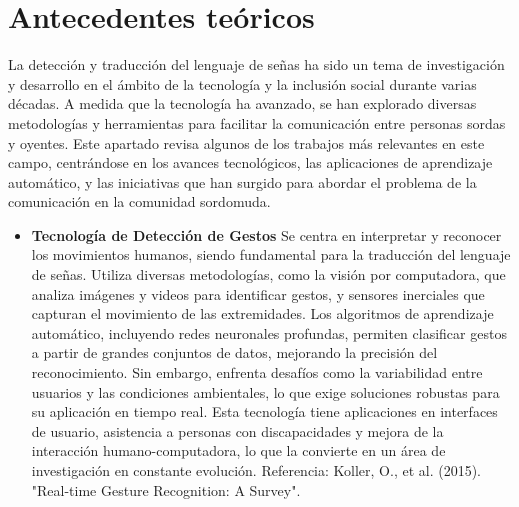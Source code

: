 \section{Antecedentes teóricos}
La detección y traducción del lenguaje de señas ha sido un tema de investigación y desarrollo en el ámbito de la tecnología y la inclusión social durante varias décadas. A medida que la tecnología ha avanzado, se han explorado diversas metodologías y herramientas para facilitar la comunicación entre personas sordas y oyentes. Este apartado revisa algunos de los trabajos más relevantes en este campo, centrándose en los avances tecnológicos, las aplicaciones de aprendizaje automático, y las iniciativas que han surgido para abordar el problema de la comunicación en la comunidad sordomuda.

\begin{itemize} 
\item \textbf{Tecnología de Detección de Gestos} \newline
Se centra en interpretar y reconocer los movimientos humanos, siendo fundamental para la traducción del lenguaje de señas. Utiliza diversas metodologías, como la visión por computadora, que analiza imágenes y videos para identificar gestos, y sensores inerciales que capturan el movimiento de las extremidades. Los algoritmos de aprendizaje automático, incluyendo redes neuronales profundas, permiten clasificar gestos a partir de grandes conjuntos de datos, mejorando la precisión del reconocimiento. Sin embargo, enfrenta desafíos como la variabilidad entre usuarios y las condiciones ambientales, lo que exige soluciones robustas para su aplicación en tiempo real. Esta tecnología tiene aplicaciones en interfaces de usuario, asistencia a personas con discapacidades y mejora de la interacción humano-computadora, lo que la convierte en un área de investigación en constante evolución. \newline
Referencia: Koller, O., et al. (2015). "Real-time Gesture Recognition: A Survey". \cite{core_ac_153562887}


\end{itemize}

